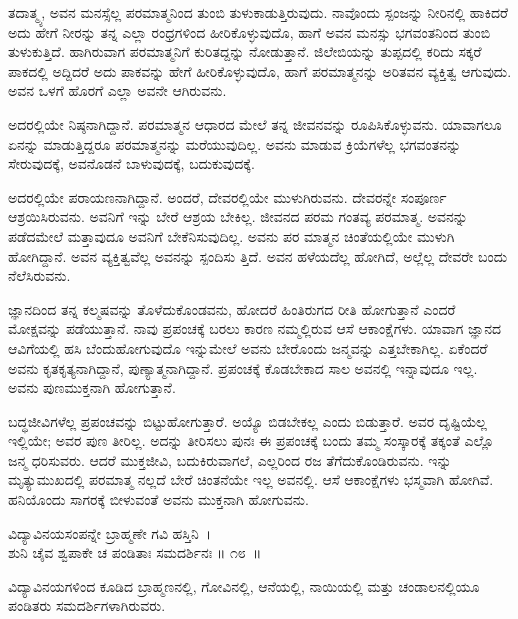 ತದಾತ್ಮ್ಯ, ಅವನ ಮನಸ್ಸೆಲ್ಲ ಪರಮಾತ್ಮನಿಂದ ತುಂಬಿ ತುಳುಕಾಡುತ್ತಿರುವುದು. ನಾವೊಂದು ಸ್ಪಂಜನ್ನು ನೀರಿನಲ್ಲಿ ಹಾಕಿದರೆ ಅದು ಹೇಗೆ ನೀರನ್ನು ತನ್ನ ಎಲ್ಲಾ ರಂಧ್ರಗಳಿಂದ ಹೀರಿಕೊಳ್ಳುವುದೊ, ಹಾಗೆ ಅವನ ಮನಸ್ಸು ಭಗವಂತನಿಂದ ತುಂಬಿ ತುಳುಕುತ್ತಿದೆ. ಹಾಗಿರುವಾಗ ಪರಮಾತ್ಮನಿಗೆ ಕುರಿತದ್ದನ್ನು ನೋಡುತ್ತಾನೆ. ಜಿಲೇಬಿಯನ್ನು ತುಪ್ಪದಲ್ಲಿ ಕರಿದು ಸಕ್ಕರೆ ಪಾಕದಲ್ಲಿ ಅದ್ದಿದರೆ ಅದು ಪಾಕವನ್ನು ಹೇಗೆ ಹೀರಿಕೊಳ್ಳುವುದೊ, ಹಾಗೆ ಪರಮಾತ್ಮನನ್ನು ಅರಿತವನ ವ್ಯಕ್ತಿತ್ವ ಆಗುವುದು. ಅವನ ಒಳಗೆ ಹೊರಗೆ ಎಲ್ಲಾ ಅವನೇ ಆಗಿರುವನು.

ಅದರಲ್ಲಿಯೇ ನಿಷ್ಠನಾಗಿದ್ದಾನೆ. ಪರಮಾತ್ಮನ ಆಧಾರದ ಮೇಲೆ ತನ್ನ ಜೀವನವನ್ನು ರೂಪಿಸಿಕೊಳ್ಳುವನು. ಯಾವಾಗಲೂ ಏನನ್ನು ಮಾಡುತ್ತಿದ್ದರೂ ಪರಮಾತ್ಮನನ್ನು ಮರೆಯುವುದಿಲ್ಲ. ಅವನು ಮಾಡುವ ಕ್ರಿಯೆಗಳೆಲ್ಲ ಭಗವಂತನನ್ನು ಸೇರುವುದಕ್ಕೆ, ಅವನೊಡನೆ ಬಾಳುವುದಕ್ಕೆ, ಬದುಕುವುದಕ್ಕೆ.

ಅದರಲ್ಲಿಯೇ ಪರಾಯಣನಾಗಿದ್ದಾನೆ. ಅಂದರೆ, ದೇವರಲ್ಲಿಯೇ ಮುಳುಗಿರುವನು. ದೇವರನ್ನೇ ಸಂಪೂರ್ಣ ಆಶ್ರಯಿಸಿರುವನು. ಅವನಿಗೆ ಇನ್ನು ಬೇರೆ ಆಶ್ರಯ ಬೇಕಿಲ್ಲ. ಜೀವನದ ಪರಮ ಗಂತವ್ಯ ಪರಮಾತ್ಮ. ಅವನನ್ನು ಪಡೆದಮೇಲೆ ಮತ್ತಾವುದೂ ಅವನಿಗೆ ಬೇಕೆನಿಸುವುದಿಲ್ಲ. ಅವನು ಪರ ಮಾತ್ಮನ ಚಿಂತೆಯಲ್ಲಿಯೇ ಮುಳುಗಿ ಹೋಗಿದ್ದಾನೆ. ಅವನ ವ್ಯಕ್ತಿತ್ವವೆಲ್ಲ ಅವನನ್ನು ಸ್ಪಂದಿಸು ತ್ತಿದೆ. ಅವನ ಹಳೆಯದೆಲ್ಲ ಹೋಗಿದೆ, ಅಲ್ಲೆಲ್ಲ ದೇವರೇ ಬಂದು ನೆಲೆಸಿರುವನು.

ಜ್ಞಾನದಿಂದ ತನ್ನ ಕಲ್ಮಷವನ್ನು ತೊಳೆದುಕೊಂಡವನು, ಹೋದರೆ ಹಿಂತಿರುಗದ ರೀತಿ ಹೋಗುತ್ತಾನೆ ಎಂದರೆ ಮೋಕ್ಷವನ್ನು ಪಡೆಯುತ್ತಾನೆ. ನಾವು ಪ್ರಪಂಚಕ್ಕೆ ಬರಲು ಕಾರಣ ನಮ್ಮಲ್ಲಿರುವ ಆಸೆ ಆಕಾಂಕ್ಷೆಗಳು. ಯಾವಾಗ ಜ್ಞಾನದ ಆವಿಗೆಯಲ್ಲಿ ಹಸಿ ಬೆಂದುಹೋಗುವುದೊ ಇನ್ನುಮೇಲೆ ಅವನು ಬೇರೊಂದು ಜನ್ಮವನ್ನು ಎತ್ತಬೇಕಾಗಿಲ್ಲ. ಏಕೆಂದರೆ ಅವನು ಕೃತಕೃತ್ಯನಾಗಿದ್ದಾನೆ, ಪುಣ್ಯಾತ್ಮನಾಗಿದ್ದಾನೆ. ಪ್ರಪಂಚಕ್ಕೆ ಕೊಡಬೇಕಾದ ಸಾಲ ಅವನಲ್ಲಿ ಇನ್ನಾವುದೂ ಇಲ್ಲ. ಅವನು ಪುಣಮುಕ್ತನಾಗಿ ಹೋಗುತ್ತಾನೆ.

ಬದ್ಧಜೀವಿಗಳೆಲ್ಲ ಪ್ರಪಂಚವನ್ನು ಬಿಟ್ಟುಹೋಗುತ್ತಾರೆ. ಅಯ್ಯೊ ಬಿಡಬೇಕಲ್ಲ ಎಂದು ಬಿಡುತ್ತಾರೆ. ಅವರ ದೃಷ್ಟಿಯೆಲ್ಲ ಇಲ್ಲಿಯೇ; ಅವರ ಪುಣ ತೀರಿಲ್ಲ. ಅದನ್ನು ತೀರಿಸಲು ಪುನಃ ಈ ಪ್ರಪಂಚಕ್ಕೆ ಬಂದು ತಮ್ಮ ಸಂಸ್ಕಾರಕ್ಕೆ ತಕ್ಕಂತೆ ಎಲ್ಲೊ ಜನ್ಮ ಧರಿಸುವರು. ಆದರೆ ಮುಕ್ತಜೀವಿ, ಬದುಕಿರುವಾಗಲೆ, ಎಲ್ಲರಿಂದ ರಜ ತೆಗೆದುಕೊಂಡಿರುವನು. ಇನ್ನು ಮೃತ್ಯುಮುಖದಲ್ಲಿ ಪರಮಾತ್ಮ ನಲ್ಲದೆ ಬೇರೆ ಚಿಂತನೆಯೇ ಇಲ್ಲ ಅವನಲ್ಲಿ. ಆಸೆ ಆಕಾಂಕ್ಷೆಗಳು ಭಸ್ಮವಾಗಿ ಹೋಗಿವೆ. ಹನಿಯೊಂದು ಸಾಗರಕ್ಕೆ ಬೀಳುವಂತೆ ಅವನು ಮುಕ್ತನಾಗಿ ಹೋಗುವನು.

\begin{shloka}
ವಿದ್ಯಾವಿನಯಸಂಪನ್ನೇ ಬ್ರಾಹ್ಮಣೇ ಗವಿ ಹಸ್ತಿನಿ~।\\ಶುನಿ ಚೈವ ಶ್ವಪಾಕೇ ಚ ಪಂಡಿತಾಃ ಸಮದರ್ಶಿನಃ \hfill॥ ೧೮~॥
\end{shloka}

\begin{artha}
ವಿದ್ಯಾವಿನಯಗಳಿಂದ ಕೂಡಿದ ಬ್ರಾಹ್ಮಣನಲ್ಲಿ, ಗೋವಿನಲ್ಲಿ, ಆನೆಯಲ್ಲಿ, ನಾಯಿಯಲ್ಲಿ ಮತ್ತು ಚಂಡಾಲನಲ್ಲಿಯೂ ಪಂಡಿತರು ಸಮದರ್ಶಿಗಳಾಗಿರುವರು.
\end{artha}

